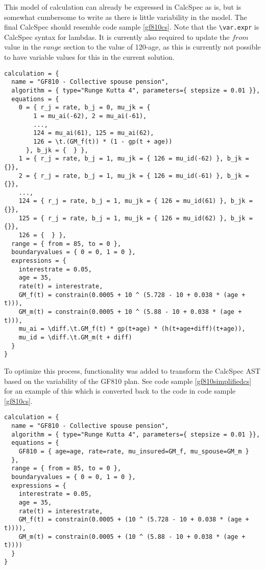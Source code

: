 This model of calculation can already be expressed in CalcSpec as is, but is somewhat cumbersome to write as there is little variability in the model.
The final CalcSpec should resemble code sample \ref{gf810cs}.
Note that the \lstinline$\var.expr$ is CalcSpec syntax for lambdas. 
It is currently also required to update the $from$ value in the $range$ section to the value of 120-age, as this is currently not possible to have variable values for this in the current solution.

\begin{lstlisting}[language=calcspec, caption=GF810 full CalcSpec, label=gf810cs]
calculation = {
  name = "GF810 - Collective spouse pension", 
  algorithm = { type="Runge Kutta 4", parameters={ stepsize = 0.01 }}, 
  equations = { 
    0 = { r_j = rate, b_j = 0, mu_jk = { 
        1 = mu_ai(-62), 2 = mu_ai(-61),
        ...,
        124 = mu_ai(61), 125 = mu_ai(62), 
        126 = \t.(GM_f(t)) * (1 - gp(t + age))
      }, b_jk = {  } }, 
    1 = { r_j = rate, b_j = 1, mu_jk = { 126 = mu_id(-62) }, b_jk = {}}, 
    2 = { r_j = rate, b_j = 1, mu_jk = { 126 = mu_id(-61) }, b_jk = {}}, 
    ...,
    124 = { r_j = rate, b_j = 1, mu_jk = { 126 = mu_id(61) }, b_jk = {}}, 
    125 = { r_j = rate, b_j = 1, mu_jk = { 126 = mu_id(62) }, b_jk = {}}, 
    126 = {  } }, 
  range = { from = 85, to = 0 }, 
  boundaryvalues = { 0 = 0, 1 = 0 }, 
  expressions = { 
    interestrate = 0.05, 
    age = 35, 
    rate(t) = interestrate, 
    GM_f(t) = constrain(0.0005 + 10 ^ (5.728 - 10 + 0.038 * (age + t))), 
    GM_m(t) = constrain(0.0005 + 10 ^ (5.88 - 10 + 0.038 * (age + t))), 
    mu_ai = \diff.\t.GM_f(t) * gp(t+age) * (h(t+age+diff)(t+age)), 
    mu_id = \diff.\t.GM_m(t + diff) 
  }
}
\end{lstlisting}

To optimize this process, functionality was added to transform the CalcSpec AST based on the variability of the GF810 plan.
See code sample \ref{gf810simplifiedcs} for an example of this which is converted back to the code in code sample \ref{gf810cs}.

\begin{lstlisting}[language=calcspec, caption=GF810 simplified CalcSpec, label=gf810simplifiedcs]
calculation = { 
  name = "GF810 - Collective spouse pension", 
  algorithm = { type="Runge Kutta 4", parameters={ stepsize = 0.01 }}, 
  equations = { 
    GF810 = { age=age, rate=rate, mu_insured=GM_f, mu_spouse=GM_m }
  }, 
  range = { from = 85, to = 0 }, 
  boundaryvalues = { 0 = 0, 1 = 0 }, 
  expressions = { 
    interestrate = 0.05,
    age = 35,
    rate(t) = interestrate,
    GM_f(t) = constrain(0.0005 + (10 ^ (5.728 - 10 + 0.038 * (age + t)))),
    GM_m(t) = constrain(0.0005 + (10 ^ (5.88 - 10 + 0.038 * (age + t))))
  }
}
\end{lstlisting}

